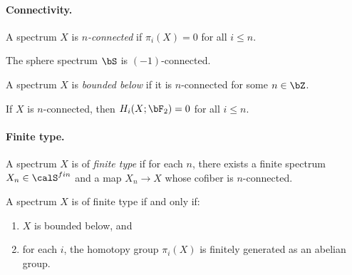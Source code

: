 \paragraph{Connectivity.}

\begin{definition}\label{prereq:def:connected}
    A spectrum $X$ is \emph{$n$-connected} if $\pi_i(X) = 0$ for all $i \le n$.
\end{definition}

\begin{axiom}\label{prereq:ax:sphere-connected}
    \leanok
    The sphere spectrum $\bS$ is $(-1)$-connected.
\end{axiom}

\begin{definition}\label{prereq:def:bounded-below}
    \leanok
    A spectrum $X$ is \emph{bounded below} if it is $n$-connected for some $n \in \bZ$.
\end{definition}

\begin{axiom}\label{prereq:ax:connected-homology-vanishing}
    \leanok
    If $X$ is $n$-connected, then $H_i(X; \bF_2) = 0$ for all $i \le n$.
\end{axiom}

\paragraph{Finite type.}

\begin{definition}\label{prereq:def:finite-type}
    A spectrum $X$ is of \emph{finite type} if for each $n$, there exists a finite spectrum $X_n \in \calS^{fin}$ and a map $X_n \to X$ whose cofiber is $n$-connected.
\end{definition}

\begin{axiom}\label{prereq:ax:finite-type-char}
    \leanok
    A spectrum $X$ is of finite type if and only if:
    \begin{enumerate}
        \item $X$ is bounded below, and
        \item for each $i$, the homotopy group $\pi_i(X)$ is finitely generated as an abelian group.
    \end{enumerate}
\end{axiom}

